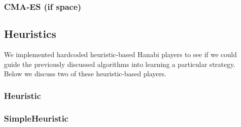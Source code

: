 \subsubsection{CMA-ES (if space)}

\subsection{Heuristics}

We implemented hardcoded heuristic-based Hanabi players to see if we could
guide the previously discussed algorithms into learning a particular strategy.
Below we discuss two of these heuristic-based players.

\subsubsection{Heuristic}
\subsubsection{SimpleHeuristic}


